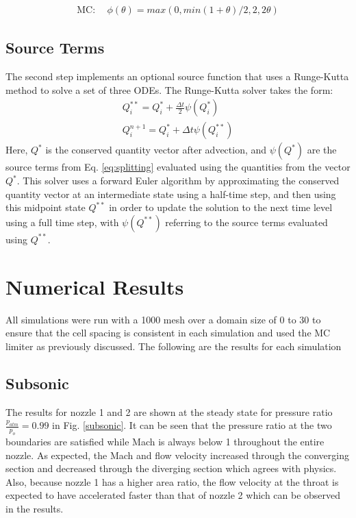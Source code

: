\documentclass{article}%
\numberwithin{equation}{section}
\begin{document}
\begin{align}
\text{MC:} \ \ & \phi(\theta)=max(0,min(1+\theta)/2,2, 2\theta)
\end{align}

\subsection{Source Terms}
The second step implements an optional source function that uses a Runge-Kutta method to solve a set of three ODEs. The Runge-Kutta solver takes the form:
\begin{equation}
\begin{split}
Q^{**}_i=Q^*_i+\frac{\Delta t}{2} \psi (Q^*_i) \\
Q^{n+1}_i=Q^*_i+ \Delta t \psi(Q^{**}_i)
\end{split}
\end{equation}
Here, $ Q^* $ is the conserved quantity vector after advection, and $ \psi(Q^*) $ are the source terms from Eq. \ref{eq:splitting} evaluated using the quantities from the vector $ Q^* $. This solver uses a forward Euler algorithm by approximating the conserved quantity vector at an intermediate state using a half-time step, and then using this midpoint state $ Q^{**} $ in order to update the solution to the next time level using a full time step, with $ \psi(Q^{**}) $ referring to the source terms evaluated using $ Q^{**} $.

\section{Numerical Results}
All simulations were run with a 1000 mesh over a domain size of 0 to 30 to ensure that the cell spacing is consistent in each simulation and used the MC limiter as previously discussed. The following are the results for each simulation

\subsection{Subsonic}
The results for nozzle 1 and 2 are shown at the steady state for pressure ratio $\frac{p_{atm}}{p_o} = 0.99$ in Fig. \ref{subsonic}. It can be seen that the pressure ratio at the two boundaries are satisfied while Mach is always below 1 throughout the entire nozzle. As expected, the Mach and flow velocity increased through the converging section and decreased through the diverging section which agrees with physics. Also, because nozzle 1 has a higher area ratio, the flow velocity at the throat is expected to have accelerated faster than that of nozzle 2 which can be observed in the results.
\end{document}
